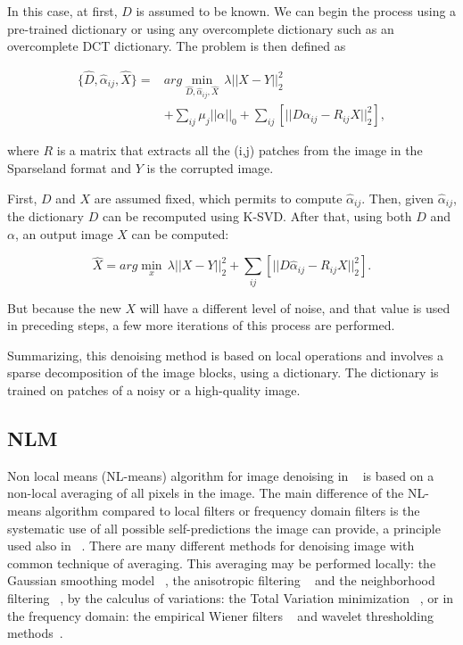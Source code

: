 In this case, at first, $D$ is assumed to be known. We can begin the process using a pre-trained dictionary or using any overcomplete dictionary such as an overcomplete DCT dictionary. The problem is then defined as

\begin{equation}
	\begin{split}
    		\{\hat{D},\hat{\alpha}_{ij},\hat{X}\} = &arg \displaystyle\min_{\hat{D},\hat{\alpha}_{ij},\hat{X}}\,\lambda||X-Y||_{2}^{2}\\&+\displaystyle \sum_{ij}\mu_{j}||\alpha||_{0}+\displaystyle \sum_{ij}[||D\alpha_{ij}-R_{ij}X||_{2}^{2}],
	\end{split}
    \label{eq:ksvd_3}
\end{equation}

where $R$ is a matrix that extracts all the (i,j) patches from the image in the Sparseland format and $Y$ is the corrupted image.

First, $D$ and $X$ are assumed fixed, which permits to compute $\hat{\alpha}_{ij}$. Then, given $\hat{\alpha}_{ij}$, the dictionary $D$ can be recomputed using K-SVD. After that, using both $D$ and $\alpha$, an output image $X$ can be computed:

\begin{equation}
    \hat{X}=arg\displaystyle\min_{x}\,\lambda||X-Y||_{2}^{2}+\displaystyle \sum_{ij}[||D\hat{\alpha}_{ij}-R_{ij}X||_{2}^{2}].
    \label{eq:ksvd_4}
\end{equation}

But because the new $X$ will have a different level of noise, and that value is used in preceding steps, a few more iterations of this process are performed.

Summarizing, this denoising method is based on local operations and involves a sparse decomposition of the image blocks, using a dictionary. The dictionary is trained on patches of a noisy or a high-quality image.

\subsection{NLM}

Non local means (NL-means) algorithm for image denoising in ~\cite{nlm} is based on a non-local averaging of all pixels in the image. The main difference of the NL-means algorithm compared to local filters or frequency domain filters is the systematic use of all possible self-predictions the image can provide, a principle used also in ~\cite{texture}. There are many different methods for denoising image with common technique of averaging. This averaging may be performed locally: the Gaussian smoothing model ~\cite{gabor}, the anisotropic filtering ~\cite{anisotropic} and the neighborhood filtering ~\cite{neighbour}, by the calculus of variations: the Total Variation minimization ~\cite{variation}, or in the frequency domain: the empirical Wiener filters ~\cite{neighbour} and wavelet thresholding methods~\cite{soft}. 

